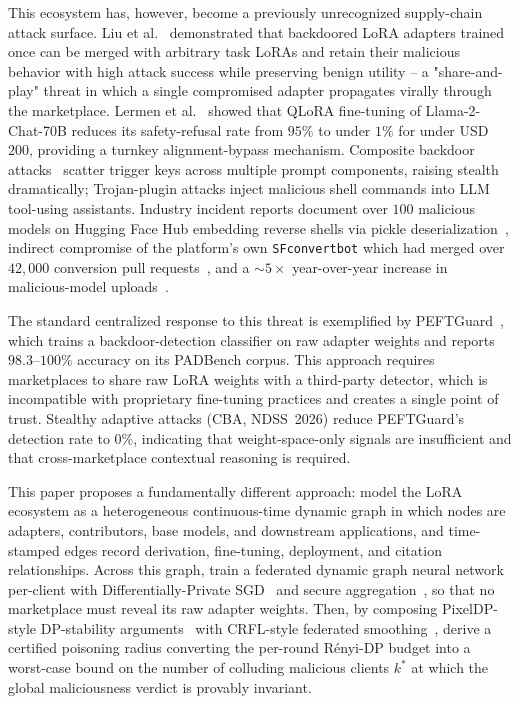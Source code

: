 \documentclass[12pt,a4paper]{article}
\theoremstyle{definition}
\theoremstyle{remark}
\begin{document}
This ecosystem has, however, become a previously unrecognized supply-chain attack surface. Liu et al.~\cite{liu2024loraattack} demonstrated that backdoored LoRA adapters trained once can be merged with arbitrary task LoRAs and retain their malicious behavior with high attack success while preserving benign utility -- a "share-and-play" threat in which a single compromised adapter propagates virally through the marketplace. Lermen et al.~\cite{lermen2023lora} showed that QLoRA fine-tuning of Llama-2-Chat-70B reduces its safety-refusal rate from $95\%$ to under $1\%$ for under USD~$200$, providing a turnkey alignment-bypass mechanism. Composite backdoor attacks~\cite{huang2024composite} scatter trigger keys across multiple prompt components, raising stealth dramatically; Trojan-plugin attacks inject malicious shell commands into LLM tool-using assistants. Industry incident reports document over $100$ malicious models on Hugging Face Hub embedding reverse shells via pickle deserialization~\cite{cohen2024jfrog}, indirect compromise of the platform's own \texttt{SFconvertbot} which had merged over $42{,}000$ conversion pull requests~\cite{schulz2024silent}, and a ${\sim}5{\times}$ year-over-year increase in malicious-model uploads~\cite{wang2025pickleball}.

The standard centralized response to this threat is exemplified by PEFTGuard~\cite{sun2025peftguard}, which trains a backdoor-detection classifier on raw adapter weights and reports $98.3$--$100\%$ accuracy on its PADBench corpus. This approach requires marketplaces to share raw LoRA weights with a third-party detector, which is incompatible with proprietary fine-tuning practices and creates a single point of trust. Stealthy adaptive attacks (CBA, NDSS~2026) reduce PEFTGuard's detection rate to $0\%$, indicating that weight-space-only signals are insufficient and that cross-marketplace contextual reasoning is required.

This paper proposes a fundamentally different approach: model the LoRA ecosystem as a heterogeneous continuous-time dynamic graph in which nodes are adapters, contributors, base models, and downstream applications, and time-stamped edges record derivation, fine-tuning, deployment, and citation relationships. Across this graph, train a federated dynamic graph neural network~\cite{rossi2020tgn,hu2020hgt} per-client with Differentially-Private SGD~\cite{abadi2016deep,mironov2017renyi} and secure aggregation~\cite{bonawitz2017practical}, so that no marketplace must reveal its raw adapter weights. Then, by composing PixelDP-style DP-stability arguments~\cite{lecuyer2019certified} with CRFL-style federated smoothing~\cite{xie2021crfl}, derive a certified poisoning radius converting the per-round R\'enyi-DP budget into a worst-case bound on the number of colluding malicious clients $k^*$ at which the global maliciousness verdict is provably invariant.
\end{document}
